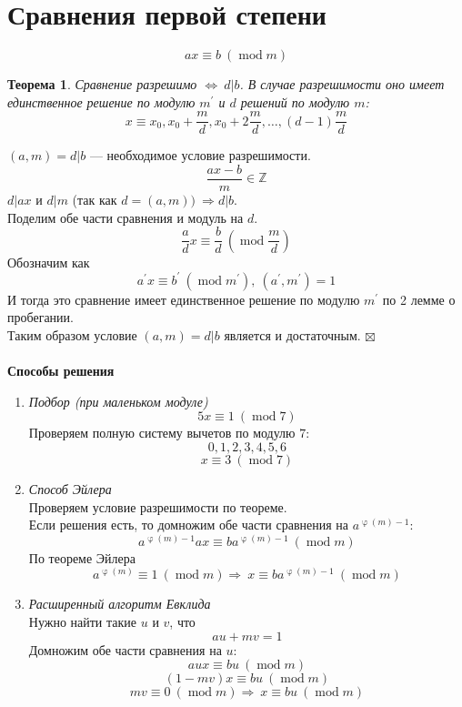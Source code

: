 \documentclass[a4paper, 12pt]{article}
\newtheorem*{theorem}{Теорема}
\newenvironment{Proof}
{\par\noindent{$\blacklozenge$}}
{\hfill$\scriptstyle\boxtimes$}
\renewcommand{\mod}{\operatorname{mod}}
\newcommand{\Z}{\mathbb{Z}}
\renewcommand{\varphi}{\upvarphi}
\begin{document}
    \section{Сравнения первой степени}
    $$ax \equiv b \ (\mod m)$$
    \begin{theorem}
        Сравнение разрешимо $\Leftrightarrow \ d|b$. В случае разрешимости оно имеет единственное решение по модулю $m^\prime$ и $d$ решений по модулю $m$: $$x \equiv x_0, x_0 + \dfrac{m}{d}, x_0+2\dfrac{m}{d}, \dots, (d-1)\dfrac{m}{d}$$
    \end{theorem}
    \begin{Proof}
        $(a,m) = d | b$ --- необходимое условие разрешимости.
        $$\dfrac{ax-b}{m} \in \Z$$
        $d | ax$  и $d | m$ (так как $d = (a, m) )\ \Rightarrow d | b$.\\
        Поделим обе части сравнения и модуль на $d$.
        $$\dfrac{a}{d}x \equiv \dfrac{b}{d} \ (\mod \dfrac{m}{d})$$
        Обозначим как $$a^\prime x \equiv b^\prime \ (\mod m^\prime), \ (a^\prime, m^\prime)=1$$
        И тогда это сравнение имеет единственное решение по модулю $m^\prime$ по 2 лемме о пробегании.\\
        Таким образом условие $(a,m) = d | b$ является и достаточным.
    \end{Proof}\\\\
    \textbf{Способы решения}
    \begin{enumerate}
        \item \textit{Подбор (при маленьком модуле)}
        $$5x \equiv 1 \ (\mod 7)$$
        Проверяем полную систему вычетов по модулю $7$:
        $$0, 1, 2, 3, 4, 5, 6$$
        $$x \equiv 3 \ (\mod 7)$$
        \item \textit{Способ Эйлера}\\
        Проверяем условие разрешимости по теореме.\\
        Если решения есть, то домножим обе части сравнения на $a^{\varphi(m)-1}$:
        $$a^{\varphi(m)-1}ax \equiv ba^{\varphi(m)-1} \ (\mod m)$$
        По теореме Эйлера $$a^{\varphi(m)} \equiv 1 \ (\mod m) \Rightarrow \ x \equiv ba^{\varphi(m)-1} \ (\mod m)$$
        \item \textit{Расширенный алгоритм Евклида}\\
        Нужно найти такие $u$ и $v$, что 
        $$au+mv=1$$
        Домножим обе части сравнения на $u$:
        $$aux \equiv bu \ (\mod m)$$
        $$(1-mv)x \equiv bu \ (\mod m)$$
        $$mv \equiv 0 \ (\mod m) \Rightarrow \ x \equiv bu \ (\mod m)$$
    \end{enumerate}
\end{document}
